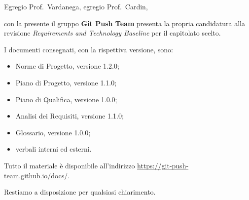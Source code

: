 \documentclass[lettera]{gpt}
\begin{document}
Egregio Prof.~Vardanega, egregio Prof.~Cardin,

con la presente il gruppo \textbf{Git Push Team} presenta la propria
candidatura alla revisione \emph{Requirements and Technology Baseline}
per il capitolato scelto.

I documenti consegnati, con la rispettiva versione, sono:
\begin{itemize}
  \item Norme di Progetto, versione 1.2.0;
  \item Piano di Progetto, versione 1.1.0;
  \item Piano di Qualifica, versione 1.0.0;
  \item Analisi dei Requisiti, versione 1.1.0;
  \item Glossario, versione 1.0.0;
  \item verbali interni ed esterni.
\end{itemize}

Tutto il materiale è disponibile all'indirizzo
\url{https://git-push-team.github.io/docs/}.

Restiamo a disposizione per qualsiasi chiarimento.
\end{document}
